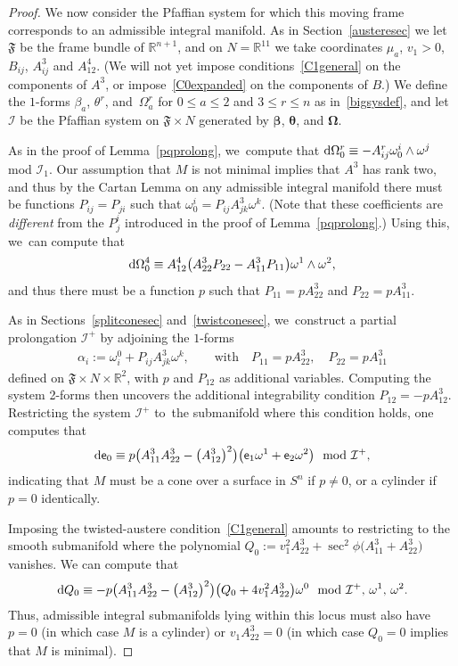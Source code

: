 \documentclass[10pt,a4paper]{amsart}
\def\R{\mathbb{R}}
\def\ve{\mathsf{e}}
\def\vOmega{\boldsymbol{\Omega}}
\def\vbeta{\boldsymbol{\beta}}
\def\vtheta{\boldsymbol{\theta}}
\def\vOmega{\boldsymbol{\Omega}}
\def\F{\mathfrak{F}}
\def\I{\mathcal{I}}
\def\w{\omega}
\numberwithin{equation}{section}
\begin{document}
\begin{proof}
We now consider the Pfaffian system for which this moving frame corresponds to an admissible integral manifold. As in Section~\ref{austeresec} we let $\F$ be the frame bundle of $\R^{n+1}$, and on $N=\R^{11}$ we take coordinates $\mu_a$, $v_1>0$, $B_{ij}$, $A^3_{ij}$ and $A^4_{12}$. (We will not yet impose conditions~\eqref{C1general} on the components of $A^3$, or impose~\eqref{C0expanded} on the components of $B$.) We define the $1$-forms $\beta_a$, $\theta^r$, and~$\Omega^r_a$ for $0\le a \le 2$ and $3 \le r \le n$ as in~\eqref{bigsysdef}, and let~$\I$ be the Pfaffian system on $\F \times N$ generated by $\vbeta$, $\vtheta$, and $\vOmega$.

As in the proof of Lemma~\ref{pqprolong}, we~compute that ${\rm d} \Omega^r_0 \equiv -A^r_{ij} \w^i_0 \wedge \w^j$ mod $\I_1$. Our assumption that $M$ is not minimal implies that $A^3$ has rank two, and thus by the Cartan Lemma on any admissible integral manifold there must be functions $P_{ij} =P_{ji}$ such that $\w^i_0 = P_{ij} A^3_{jk} \w^k$. (Note that these coefficients are \emph{different} from the $P^i_j$ introduced in the proof of Lemma~\ref{pqprolong}.) Using this, we~can compute that
\begin{gather*}
{\rm d} \Omega^4_0 \equiv A^4_{12} \big(A^3_{22} P_{22} - A^3_{11} P_{11}\big)\w^1 \wedge \w^2,
\end{gather*}
and thus there must be a function $p$ such that $P_{11}=p A^3_{22}$ and $P_{22} = p A^3_{11}$.

As in Sections~\ref{splitconesec} and~\ref{twistconesec}, we~construct a partial prolongation $\I^+$ by adjoining the $1$-forms
\begin{gather*}
\alpha_i := \w^0_i + P_{ij} A^3_{jk} \w^k, \qquad\text{with} \quad P_{11}=p A^3_{22},\quad P_{22} = p A^3_{11}
\end{gather*}
defined on $\F\times N \times \R^2$, with $p$ and $P_{12}$ as additional variables. Computing the system 2-forms then uncovers the additional integrability condition $P_{12}=-p A^3_{12}$. Restricting the system $\I^+$ to~the submanifold where this condition holds, one computes that
\begin{gather*}
{\rm d}\ve_0 \equiv p \big(A^3_{11} A^3_{22} - \big(A^3_{12}\big)^2\big) \big(\ve_1 \w^1 + \ve_2 \w^2\big)\mod \I^+,
\end{gather*}
indicating that $M$ must be a cone over a surface in $S^n$ if $p\ne0$, or a cylinder if $p=0$ identically.

Imposing the twisted-austere condition~\eqref{C1general} amounts to restricting to the smooth submanifold where the polynomial $Q_0:= v_1^2 A^3_{22} + \sec^2\phi\big(A^3_{11} + A^3_{22}\big)$ vanishes. We can compute that
\begin{gather*}
{\rm d}Q_0 \equiv -p \big(A^3_{11} A^3_{22} - \big(A^3_{12}\big)^2\big) \big(Q_0 + 4 v_1^2 A^3_{22}\big)\w^0 \mod \I^+,\, \w^1, \, \w^2.
\end{gather*}
Thus, admissible integral submanifolds lying within this locus must also have $p=0$ (in which case $M$ is a cylinder) or $v_1 A^3_{22}=0$ (in which case $Q_0=0$ implies that $M$ is minimal).


\end{proof}
\end{document}
